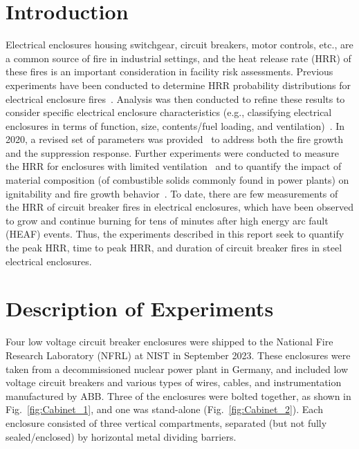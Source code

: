 \documentclass[12pt]{article}
\begin{document}
\pagebreak


\section{Introduction}

Electrical enclosures housing switchgear, circuit breakers, motor controls, etc., are a common source of fire in industrial settings, and the heat release rate (HRR) of these fires is an important consideration in facility risk assessments. Previous experiments have been conducted to determine HRR probability distributions for electrical enclosure fires~\cite{NUREG/CR-7197}. Analysis was then conducted to refine these results to consider specific electrical enclosure characteristics (e.g., classifying electrical enclosures in terms of function, size, contents/fuel loading, and ventilation)~\cite{NUREG-2178}.
In 2020, a revised set of parameters was provided~\cite{NUREG2230} to address both the fire growth and the suppression response. Further experiments were conducted to measure the HRR for enclosures with limited ventilation~\cite{OLIVE-FIRE} and to quantify the impact of material composition (of combustible solids commonly found in power plants) on ignitability and fire growth behavior~\cite{leventon2024nist}. To date, there are few measurements of the HRR of circuit breaker fires in electrical enclosures, which have been observed to grow and continue burning for tens of minutes after high energy arc fault (HEAF) events. Thus, the experiments described in this report seek to quantify the peak HRR, time to peak HRR, and duration of circuit breaker fires in steel electrical enclosures.


\section{Description of Experiments}

Four low voltage circuit breaker enclosures were shipped to the National Fire Research Laboratory (NFRL) at NIST in September 2023. These enclosures were taken from a decommissioned nuclear power plant in Germany, and included low voltage circuit breakers and various types of wires, cables, and instrumentation manufactured by ABB. Three of the enclosures were bolted together, as shown in Fig.~\ref{fig:Cabinet_1}, and one was stand-alone (Fig.~\ref{fig:Cabinet_2}). Each enclosure consisted of three vertical compartments, separated (but not fully sealed/enclosed) by horizontal metal dividing barriers.
\end{document}
